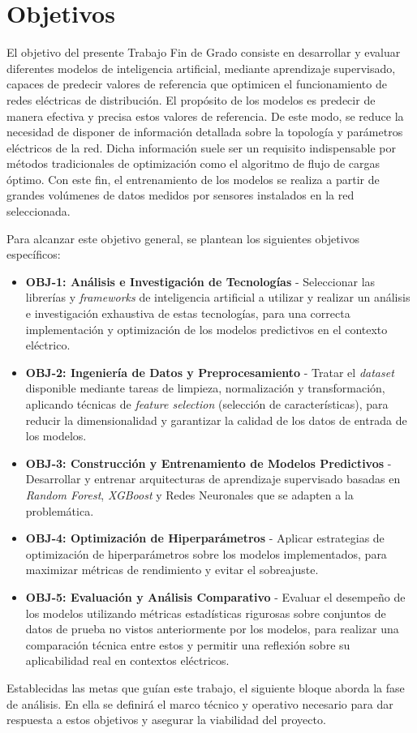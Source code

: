 \chapter{Objetivos}\label{cap:objetivos}

El objetivo del presente Trabajo Fin de Grado consiste en desarrollar y evaluar diferentes modelos de inteligencia artificial, mediante aprendizaje supervisado, capaces de predecir valores de referencia que optimicen el funcionamiento de redes eléctricas de distribución. El propósito de los modelos es predecir de manera efectiva y precisa estos valores de referencia. De este modo, se reduce la necesidad de disponer de información detallada sobre la topología y parámetros eléctricos de la red. Dicha información suele ser un requisito indispensable por métodos tradicionales de optimización como el algoritmo de flujo de cargas óptimo. Con este fin, el entrenamiento de los modelos se realiza a partir de grandes volúmenes de datos medidos por sensores instalados en la red seleccionada.

Para alcanzar este objetivo general, se plantean los siguientes objetivos específicos:
\begin{itemize}
	\item \textbf{OBJ-1: Análisis e Investigación de Tecnologías} \label{objetivo1} - Seleccionar las librerías y \textit{frameworks} de inteligencia artificial a utilizar y realizar un análisis e investigación exhaustiva de estas tecnologías, para una correcta implementación y optimización de los modelos predictivos en el contexto eléctrico.
	\item \textbf{OBJ-2: Ingeniería de Datos y Preprocesamiento} \label{objetivo2} - Tratar el \textit{dataset} disponible mediante tareas de limpieza, normalización y transformación, aplicando técnicas de \textit{feature selection} (selección de características), para reducir la dimensionalidad y garantizar la calidad de los datos de entrada de los modelos.
	\item \textbf{OBJ-3: Construcción y Entrenamiento de Modelos Predictivos} \label{objetivo3} - Desarrollar y entrenar arquitecturas de aprendizaje supervisado basadas en \textit{Random Forest}, \textit{XGBoost} y Redes Neuronales que se adapten a la problemática.
	\item \textbf{OBJ-4: Optimización de Hiperparámetros} \label{objetivo4} - Aplicar estrategias de optimización de hiperparámetros sobre los modelos implementados, para maximizar métricas de rendimiento y evitar el sobreajuste.
	\item \textbf{OBJ-5: Evaluación y Análisis Comparativo} \label{objetivo5} - Evaluar el desempeño de los modelos utilizando métricas estadísticas rigurosas sobre conjuntos de datos de prueba no vistos anteriormente por los modelos, para realizar una comparación técnica entre estos y permitir una reflexión sobre su aplicabilidad real en contextos eléctricos.
\end{itemize}

Establecidas las metas que guían este trabajo, el siguiente bloque aborda la fase de análisis. En ella se definirá el marco técnico y operativo necesario para dar respuesta a estos objetivos y asegurar la viabilidad del proyecto.